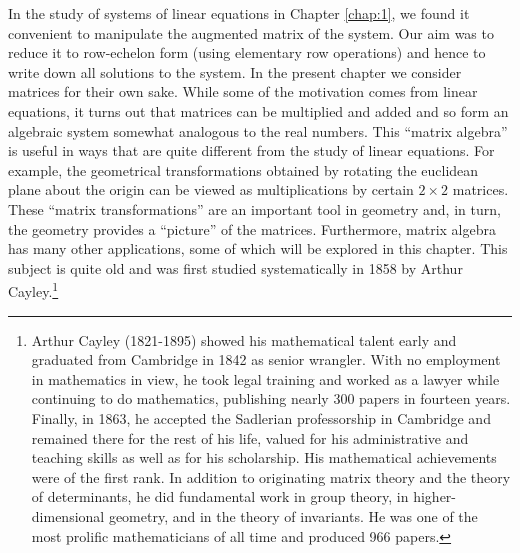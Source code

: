 \noindent In the study of systems of linear equations in Chapter \ref{chap:1}, we found it convenient to manipulate the augmented matrix of the system. Our aim was to reduce it to row-echelon form (using elementary row operations) and hence to write down all solutions to the system. In the present chapter we consider matrices for their own sake. While some of the motivation comes from linear equations, it turns out that matrices can be multiplied and added and so form an algebraic system somewhat analogous to the real numbers. This ``matrix algebra'' is useful in ways that are quite different from the study of linear equations. For example, the geometrical transformations obtained by rotating the euclidean plane about the origin can be viewed as multiplications by certain $2 \times 2$ matrices. These ``matrix transformations'' are an important tool in geometry and, in turn, the geometry provides a ``picture'' of the matrices. Furthermore, matrix algebra has many other applications, some of which will be explored in this chapter. This subject is quite old and was first studied systematically in 1858 by Arthur Cayley.\footnote{Arthur Cayley (1821-1895) showed his mathematical talent early and graduated from Cambridge in 1842 as senior wrangler. With no employment in mathematics in view, he took legal training and worked as a lawyer while continuing to do mathematics, publishing nearly 300 papers in fourteen years. Finally, in 1863, he accepted the Sadlerian professorship in Cambridge and remained there for the rest of his life, valued for his administrative and teaching skills as well as for his scholarship. His mathematical achievements were of the first rank. In addition to originating matrix theory and the theory of determinants, he did fundamental work in group theory, in higher-dimensional geometry, and in the theory of invariants. He was one of the most prolific mathematicians of all time and produced 966 papers.}
